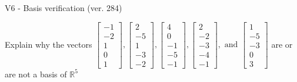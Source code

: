 \begin{exercise}
  \begin{exerciseTitle}V6 - Basis verification (ver. 284)\end{exerciseTitle}
  \begin{exerciseStatement}
    Explain why the vectors \(\left[\begin{array}{r}
-1 \\
-2 \\
1 \\
0 \\
1
\end{array}\right] , \left[\begin{array}{r}
2 \\
-5 \\
1 \\
-3 \\
-2
\end{array}\right] , \left[\begin{array}{r}
4 \\
0 \\
-1 \\
-5 \\
-1
\end{array}\right] , \left[\begin{array}{r}
2 \\
-2 \\
-3 \\
-4 \\
-1
\end{array}\right] , \text{ and } \left[\begin{array}{r}
1 \\
-5 \\
-3 \\
0 \\
3
\end{array}\right]\) are or are not a basis of \(\mathbb{R}^5\)	



\end{exerciseStatement}
\end{exercise}
